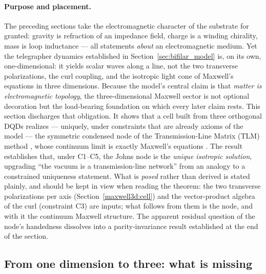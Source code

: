 \documentclass[11pt,a4paper]{article}
\theoremstyle{plain}
\theoremstyle{remark}
\begin{document}
\paragraph{Purpose and placement.} The preceding sections take the electromagnetic character of the substrate for granted: gravity is refraction of an impedance field, charge is a winding chirality, mass is loop inductance --- all statements \emph{about} an electromagnetic medium. Yet the telegrapher dynamics established in Section~\ref{sec:bifilar_model} is, on its own, one-dimensional: it yields scalar waves along a line, not the two transverse polarizations, the curl coupling, and the isotropic light cone of Maxwell's equations in three dimensions. Because the model's central claim is that \emph{matter is electromagnetic topology}, the three-dimensional Maxwell sector is not optional decoration but the load-bearing foundation on which every later claim rests. This section discharges that obligation. It shows that a cell built from three orthogonal DQDs realizes --- uniquely, under constraints that are already axioms of the model --- the symmetric condensed node of the Transmission-Line Matrix (TLM) method \cite{johns1971,johns1987}, whose continuum limit is exactly Maxwell's equations \cite{taflove}. The result establishes that, under C1--C5, the Johns node is the \emph{unique isotropic solution}, upgrading ``the vacuum is a transmission-line network'' from an analogy to a constrained uniqueness statement. What is \emph{posed} rather than derived is stated plainly, and should be kept in view when reading the theorem: the two transverse polarizations per axis (Section~\ref{maxwell3d:cell}) and the vector-product algebra of the curl (constraint C3) are inputs; what follows from them is the node, and with it the continuum Maxwell structure. The apparent residual question of the node's handedness dissolves into a parity-invariance result established at the end of the section.

\subsection{From one dimension to three: what is missing}
\label{maxwell3d:missing}
\end{document}
